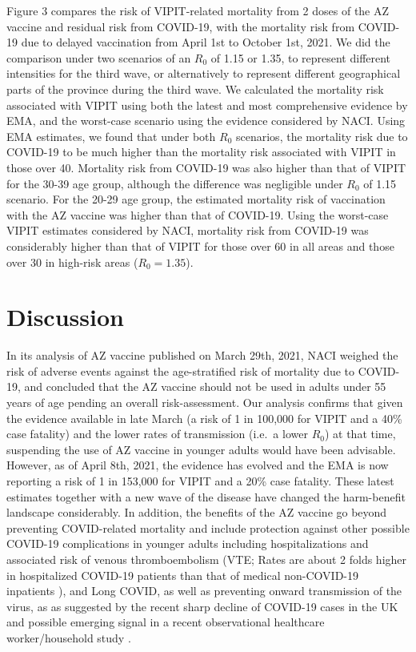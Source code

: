 \documentclass[]{interact}
\theoremstyle{plain}%
\theoremstyle{definition}
\theoremstyle{remark}
\begin{document}
Figure 3 compares the risk of VIPIT-related mortality from 2 doses of
the AZ vaccine and residual risk from COVID-19, with the mortality risk
from COVID-19 due to delayed vaccination from April 1st to October 1st,
2021. We did the comparison under two scenarios of an \(R_0\) of 1.15 or
1.35, to represent different intensities for the third wave, or
alternatively to represent different geographical parts of the province
during the third wave. We calculated the mortality risk associated with
VIPIT using both the latest and most comprehensive evidence by EMA, and
the worst-case scenario using the evidence considered by NACI. Using EMA
estimates, we found that under both \(R_0\) scenarios, the mortality
risk due to COVID-19 to be much higher than the mortality risk
associated with VIPIT in those over 40. Mortality risk from COVID-19 was
also higher than that of VIPIT for the 30-39 age group, although the
difference was negligible under \(R_0\) of 1.15 scenario. For the 20-29
age group, the estimated mortality risk of vaccination with the AZ
vaccine was higher than that of COVID-19. Using the worst-case VIPIT
estimates considered by NACI, mortality risk from COVID-19 was
considerably higher than that of VIPIT for those over 60 in all areas
and those over 30 in high-risk areas (\(R_0=1.35\)).

\hypertarget{discussion}{%
\section{Discussion}\label{discussion}}

In its analysis of AZ vaccine published on March 29th, 2021, NACI
weighed the risk of adverse events against the age-stratified risk of
mortality due to COVID-19, and concluded that the AZ vaccine should not
be used in adults under 55 years of age pending an overall
risk-assessment. Our analysis confirms that given the evidence available
in late March (a risk of 1 in 100,000 for VIPIT and a 40\% case
fatality) and the lower rates of transmission (i.e.~a lower \(R_0\)) at
that time, suspending the use of AZ vaccine in younger adults would have
been advisable. However, as of April 8th, 2021, the evidence has evolved
and the EMA is now reporting a risk of 1 in 153,000 for VIPIT and a 20\%
case fatality. These latest estimates together with a new wave of the
disease have changed the harm-benefit landscape considerably. In
addition, the benefits of the AZ vaccine go beyond preventing
COVID-related mortality and include protection against other possible
COVID-19 complications in younger adults including hospitalizations and
associated risk of venous thromboembolism (VTE; Rates are about 2 folds
higher in hospitalized COVID-19 patients than that of medical
non-COVID-19 inpatients \citep{alberta_health_services_covid-19_2021}),
and Long COVID, as well as preventing onward transmission of the virus,
as as suggested by the recent sharp decline of COVID-19 cases in the UK
\citep{govuk_official_2021} and possible emerging signal in a recent
observational healthcare worker/household study
\citep{shah_effect_2021}.
\end{document}
